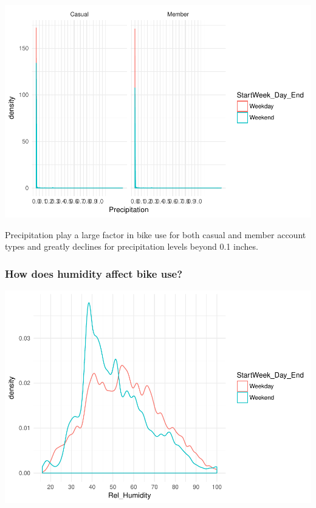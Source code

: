 \documentclass[]{article}
\newenvironment{Shaded}{\begin{snugshade}}{\end{snugshade}}
\newcommand{\KeywordTok}[1]{\textcolor[rgb]{0.13,0.29,0.53}{\textbf{#1}}}
\newcommand{\DataTypeTok}[1]{\textcolor[rgb]{0.13,0.29,0.53}{#1}}
\newcommand{\DecValTok}[1]{\textcolor[rgb]{0.00,0.00,0.81}{#1}}
\newcommand{\StringTok}[1]{\textcolor[rgb]{0.31,0.60,0.02}{#1}}
\newcommand{\CommentTok}[1]{\textcolor[rgb]{0.56,0.35,0.01}{\textit{#1}}}
\newcommand{\OperatorTok}[1]{\textcolor[rgb]{0.81,0.36,0.00}{\textbf{#1}}}
\newcommand{\NormalTok}[1]{#1}
\begin{document}
\includegraphics{Nice_Ride_Project_Stat_ReportDRAFT_files/figure-latex/unnamed-chunk-12-3.pdf}

Precipitation play a large factor in bike use for both casual and member
account types and greatly declines for precipitation levels beyond 0.1
inches.

\subsubsection{How does humidity affect bike
use?}\label{how-does-humidity-affect-bike-use}

\begin{Shaded}
\end{Shaded}

\includegraphics{Nice_Ride_Project_Stat_ReportDRAFT_files/figure-latex/unnamed-chunk-13-1.pdf}
\end{document}
